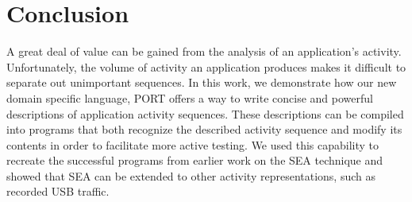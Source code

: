 \section{Conclusion}
\label{sec:Conclusion}
%
%

A great deal of value can be gained from the analysis of an application's
activity.
Unfortunately,
the volume of activity
an application produces
makes it difficult
to separate out
unimportant sequences.
In this work,
we demonstrate how our new domain specific language,
PORT offers
a way to write concise and 
powerful
descriptions of
application activity sequences.
These descriptions
can be compiled
into programs that
both recognize the described activity
sequence
and modify its contents in order to
facilitate more active testing.
We used this capability to recreate the successful programs from earlier work on the SEA technique and showed that SEA can be extended to other activity representations, such as recorded USB traffic.


